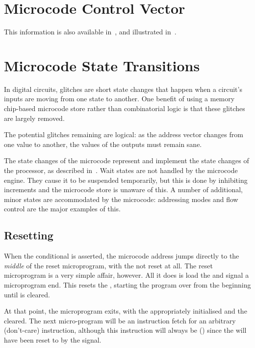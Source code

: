 \section{Microcode Control Vector}

This information is also available in~, and
illustrated in~.





\section{Microcode State Transitions}

In digital circuits, glitches are short state changes that happen when a
circuit's inputs are moving from one state to another. One benefit of using a
memory chip-based microcode store rather than combinatorial logic is that these
glitches are largely removed.

The potential glitches remaining are logical: as the address vector
changes from one value to another, the values of the outputs must
remain sane.

The state changes of the microcode represent and implement the state
changes of the processor, as described in~. Wait
states are not handled by the microcode engine. They cause it to be
suspended temporarily, but this is done by inhibiting \UPC{}
increments and the microcode store is unaware of this. A number of
additional, minor states are accommodated by the microcode: addressing
modes and flow control are the major examples of this.

\subsection{Resetting}

When the  conditional is asserted, the microcode address jumps
directly to the {\em middle\/} of the reset microprogram, with the
\UPC{} not reset at all. The reset microprogram is a very simple
affair, however. All it does is load the \PC{} and signal a
microprogram end. This resets the \UPC{}, starting the program over
from the beginning until  is cleared.

At that point, the microprogram exits, with the \PC{} appropriately
initialised and the \UPC{} cleared. The next micro-program will be an
instruction fetch for an arbitrary (don't-care) instruction, although
this instruction will always be  () since the
\IR{} will have been reset to  by the  signal.

